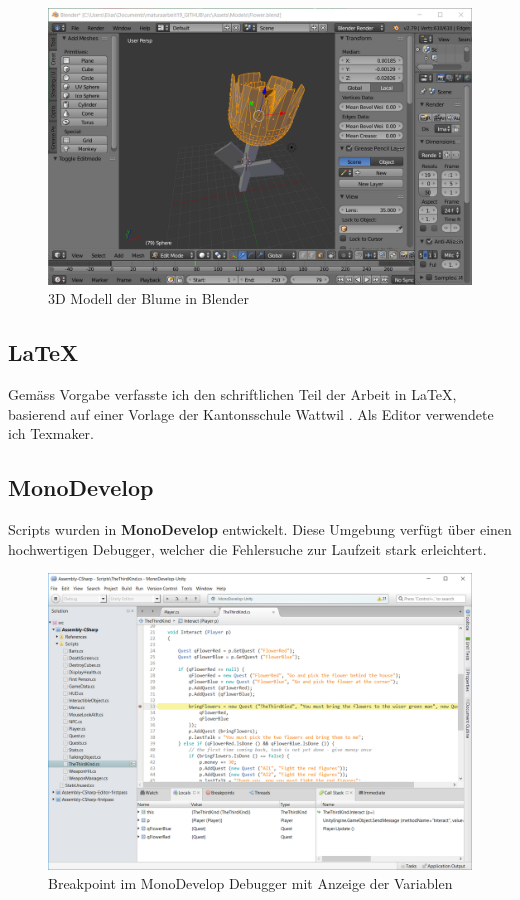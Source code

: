 \begin{figure}[H]
\includegraphics[scale=0.66]{screenshots/blenderflower.png}
\caption{3D Modell der Blume in Blender}
\end{figure}

\subsection{LaTeX}

Gemäss Vorgabe verfasste ich den schriftlichen Teil der Arbeit in LaTeX, basierend auf einer Vorlage der Kantonsschule Wattwil .
Als Editor verwendete ich Texmaker.

\subsection{MonoDevelop}

Scripts wurden in \textbf{MonoDevelop} entwickelt.
Diese Umgebung verfügt über einen hochwertigen Debugger, welcher die Fehlersuche zur Laufzeit stark erleichtert.

\begin{figure}[H]
\includegraphics[scale=0.5]{screenshots/monodevelop.png}
\caption{Breakpoint im MonoDevelop Debugger mit Anzeige der Variablen}
\end{figure}

